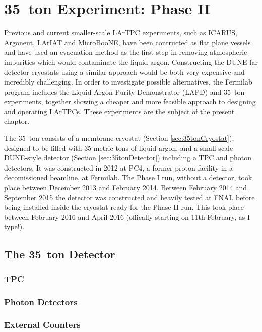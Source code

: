 \section{35~ton Experiment: Phase II}\label{sec:35tonPhaseII}

Previous and current smaller-scale LArTPC experiments, such as ICARUS, Argoneut, LArIAT and MicroBooNE, have been contructed as flat plane vessels and have used an evacuation method as the first step in removing atmospheric impurities which would contaminate the liquid argon.  Constructing the DUNE far detector cryostats using a similar approach would be both very expensive and incredibly challenging.  In order to investigate possible alternatives, the Fermilab program includes the Liquid Argon Purity Demonstrator (LAPD) and 35~ton experiments, together showing a cheaper and more feasible approach to designing and operating LArTPCs.  These experiments are the subject of the present chaptor.

The 35~ton consists of a membrane cryostat (Section \ref{sec:35tonCryostat}), designed to be filled with 35 metric tons of liquid argon, and a small-scale DUNE-style detector (Section \ref{sec:35tonDetector}) including a TPC and photon detectors.  It was constructed in 2012 at PC4, a former proton facility in a decomissioned beamline, at Fermilab.  The Phase I run, without a detector, took place between December 2013 and February 2014.  Between February 2014 and September 2015 the detector was constructed and heavily tested at FNAL before being installed inside the cryostat ready for the Phase II run.  This took place between February 2016 and April 2016 (offically starting on 11th February, as I type!).

\subsection{The 35~ton Detector}

\subsubsection{TPC}

\subsubsection{Photon Detectors}

\subsubsection{External Counters}


